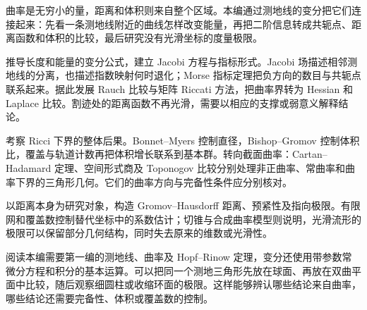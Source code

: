 
% 

\BookPartGuide
曲率是无穷小的量，距离和体积则来自整个区域。本编通过测地线的变分把它们连接起来：先看一条测地线附近的曲线怎样改变能量，再把二阶信息转成共轭点、距离函数和体积的比较，最后研究没有光滑坐标的度量极限。

\ProseParagraphBreak
{}推导长度和能量的变分公式，建立 Jacobi 方程与指标形式。Jacobi 场描述相邻测地线的分离，也描述指数映射何时退化；Morse 指标定理把负方向的数目与共轭点联系起来。据此发展 Rauch 比较与矩阵 Riccati 方法，把曲率界转为 Hessian 和 Laplace 比较。割迹处的距离函数不再光滑，需要以相应的支撑或弱意义解释结论。

\ProseParagraphBreak
{}考察 Ricci 下界的整体后果。Bonnet--Myers 控制直径，Bishop--Gromov 控制体积比，覆盖与轨道计数再把体积增长联系到基本群。转向截面曲率：Cartan--Hadamard 定理、空间形式商及 Toponogov 比较分别处理非正曲率、常曲率和曲率下界的三角形几何。它们的曲率方向与完备性条件应分别核对。

\ProseParagraphBreak
{}以距离本身为研究对象，构造 Gromov--Hausdorff 距离、预紧性及指向极限。有限网和覆盖数控制替代坐标中的系数估计；切锥与合成曲率模型则说明，光滑流形的极限可以保留部分几何结构，同时失去原来的维数或光滑性。

\ProseParagraphBreak
阅读本编需要第一编的测地线、曲率及 Hopf--Rinow 定理，变分还使用带参数常微分方程和积分的基本运算。可以把同一个测地三角形先放在球面、再放在双曲平面中比较，随后观察细圆柱或收缩环面的极限。这样能够辨认哪些结论来自曲率，哪些结论还需要完备性、体积或覆盖数的控制。






